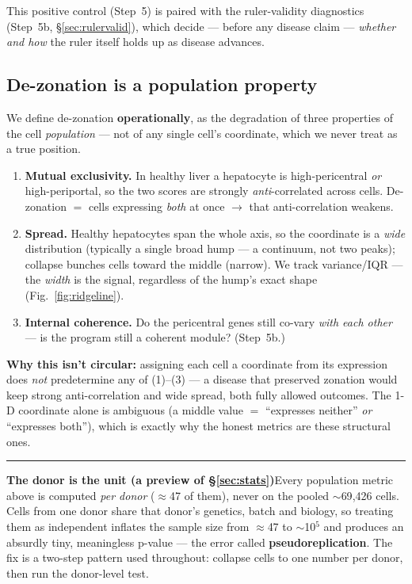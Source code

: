 \documentclass[11pt]{article}
\newcommand{\aside}[2]{\par\medskip\noindent\textcolor{teal0}{\rule{2pt}{\baselineskip}}\quad\textbf{\textcolor{teal0}{#1}}\quad #2\par\medskip}
\begin{document}
This positive control (Step~5) is paired with the ruler-validity diagnostics (Step~5b,
\S\ref{sec:rulervalid}), which decide --- before any disease claim --- \emph{whether and how} the ruler
itself holds up as disease advances.

\subsection{De-zonation is a population property}
\label{sec:popprop}

We define de-zonation \textbf{operationally}, as the degradation of three properties of the cell
\emph{population} --- not of any single cell's coordinate, which we never treat as a true position.

\begin{enumerate}[leftmargin=1.6em]
\item \textbf{Mutual exclusivity.} In healthy liver a hepatocyte is high-pericentral \emph{or}
high-periportal, so the two scores are strongly \emph{anti}-correlated across cells. De-zonation $=$
cells expressing \emph{both} at once $\to$ that anti-correlation weakens.
\item \textbf{Spread.} Healthy hepatocytes span the whole axis, so the coordinate is a \emph{wide}
distribution (typically a single broad hump --- a continuum, not two peaks); collapse bunches cells
toward the middle (narrow). We track variance/IQR --- the \emph{width} is the signal, regardless of the
hump's exact shape (Fig.~\ref{fig:ridgeline}).
\item \textbf{Internal coherence.} Do the pericentral genes still co-vary \emph{with each other} --- is
the program still a coherent module? (Step~5b.)
\end{enumerate}

\textbf{Why this isn't circular:} assigning each cell a coordinate from its expression does \emph{not}
predetermine any of (1)--(3) --- a disease that preserved zonation would keep strong anti-correlation
and wide spread, both fully allowed outcomes. The 1-D coordinate alone is ambiguous (a middle value $=$
``expresses neither'' \emph{or} ``expresses both''), which is exactly why the honest metrics are these
structural ones.

\aside{The donor is the unit (a preview of \S\ref{sec:stats})}{Every population metric above is computed
\emph{per donor} ($\approx$47 of them), never on the pooled $\sim$69{,}426 cells. Cells from one donor
share that donor's genetics, batch and biology, so treating them as independent inflates the sample size
from $\approx$47 to $\sim$10$^5$ and produces an absurdly tiny, meaningless p-value --- the error called
\textbf{pseudoreplication}. The fix is a two-step pattern used throughout: collapse cells to one number
per donor, then run the donor-level test.}
\end{document}
